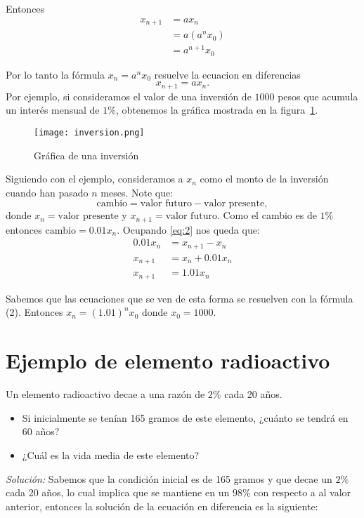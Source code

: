 \documentclass{report}
\begin{document}
Entonces
\begin{align*}
  x_{n+1}&=ax_n\\
        &=a(a^nx_0)\\
       &=a^{n+1}x_0
\end{align*}

Por lo tanto la fórmula $x_n=a^nx_0$ resuelve la ecuacion en
diferencias $$x_{n+1}=ax_n.$$
Por ejemplo, si consideramos el valor de una inversión de $1000$ pesos
que acumula un interés mensual de $1\%$, obtenemos la gráfica mostrada
en la figura~\ref{inversion}.

\begin{figure}
  \centering
  \texttt{[image: inversion.png]}
  \caption{Gráfica de una inversión}
  \label{inversion}
\end{figure}

Siguiendo con el ejemplo, consideramos a $x_n$ como el monto
de la inversión cuando han pasado $n$ meses.  Note que:
\begin{equation}
  \label{eq:2}
  \text{cambio}=\text{valor futuro}-\text{valor presente},
\end{equation}
donde $x_n=\text{valor presente}$ y $x_{n+1}=\text{valor futuro}$.
Como el cambio es de $1\%$ entonces $\text{cambio}=0.01x_n$.  Ocupando
\eqref{eq:2} nos queda que:
\begin{align*}
  0.01x_n&=x_{n+1}-x_n\\
  x_{n+1}&=x_n+0.01x_n\\
 x_{n+1}&=1.01x_n
\end{align*}

Sabemos que las ecuaciones que se ven de esta forma se resuelven con
la fórmula (2).  Entonces $x_n=(1.01)^nx_0$ donde $x_0=1000$.

\section{Ejemplo de elemento radioactivo}

Un elemento radioactivo decae a una razón de $2\%$ cada 20 años.
\begin{itemize}
\item Si inicialmente se tenían 165 gramos de este elemento, ¿cuánto
  se tendrá en 60 años?
 \item ¿Cuál es la vida media de este elemento?
\end{itemize}

\textit{Solución:} Sabemos que la condición inicial es de 165 gramos y
que decae un $2\%$ cada 20 años, lo cual implica que se mantiene en un
$98\%$ con respecto a al valor anterior, entonces la solución de la
ecuación en diferencia es la siguiente:
\end{document}
